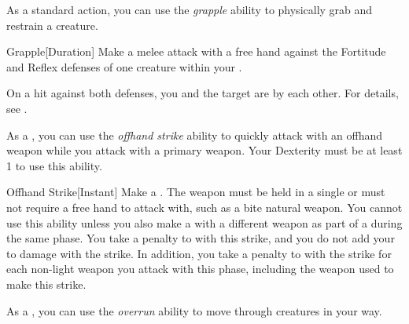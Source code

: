         \label{Grapple} As a standard action, you can use the \textit{grapple} ability to physically grab and restrain a creature.

        \begin{durationability}{Grapple}[Duration]
            \rankline
            Make a melee attack with a free hand against the Fortitude and Reflex defenses of one creature within your .

            On a hit against both defenses, you and the target are \grappled by each other.
            For details, see .
        \end{durationability}

        \label{Offhand Strike} As a , you can use the \textit{offhand strike} ability to quickly attack with an offhand weapon while you attack with a primary weapon.
        Your Dexterity must be at least 1 to use this ability.
        \begin{instantability}{Offhand Strike}[Instant]
            \rankline
            Make a .
            The weapon must be held in a single  or must not require a free hand to attack with, such as a bite natural weapon.
            You cannot use this ability unless you also make a  with a different weapon as part of a  during the same phase.
            You take a  penalty to  with this strike, and you do not add your  to damage with the strike.
            In addition, you take a  penalty to  with the strike for each non-light weapon you attack with this phase, including the weapon used to make this strike.
        \end{instantability}

        \label{Overrun} As a , you can use the \textit{overrun} ability to move through creatures in your way.

